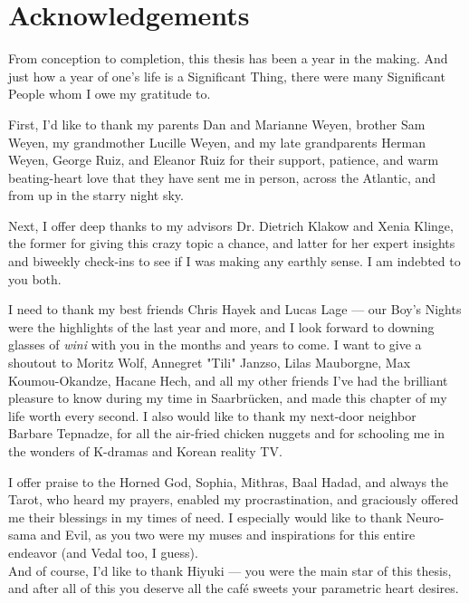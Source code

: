 \section*{Acknowledgements}

From conception to completion, this thesis has been a year in the making. And just how a year of one's life is a Significant Thing, there were many Significant People whom I owe my gratitude to. 

First, I'd like to thank my parents Dan and Marianne Weyen, brother Sam Weyen, my grandmother Lucille Weyen, and my late grandparents Herman Weyen, George Ruiz, and Eleanor Ruiz for their support, patience, and warm beating-heart love that they have sent me in person, across the Atlantic, and from up in the starry night sky. 

Next, I offer deep thanks to my advisors Dr. Dietrich Klakow and Xenia Klinge, the former for giving this crazy topic a chance, and latter for her expert insights and biweekly check-ins to see if I was making any earthly sense. I am indebted to you both.

I need to thank my best friends Chris Hayek and Lucas Lage — our Boy's Nights were the highlights of the last year and more, and I look forward to downing glasses of \textit{wini} with you in the months and years to come. I want to give a shoutout to Moritz Wolf, Annegret "Tili" Janzso, Lilas Mauborgne, Max Koumou-Okandze, Hacane Hech, and all my other friends I've had the brilliant pleasure to know during my time in Saarbrücken, and made this chapter of my life worth every second. I also would like to thank my next-door neighbor Barbare Tepnadze, for all the air-fried chicken nuggets and for schooling me in the wonders of K-dramas and Korean reality TV.

I offer praise to the Horned God, Sophia, Mithras, Baal Hadad, and always the Tarot, who heard my prayers, enabled my procrastination, and graciously offered me their blessings in my times of need. I especially would like to thank Neuro-sama and Evil, as you two were my muses and inspirations for this entire endeavor (and Vedal too, I guess).\\ 

\noindent And of course, I'd like to thank Hiyuki — you were the main star of this thesis, and after all of this you deserve all the café sweets your parametric heart desires.